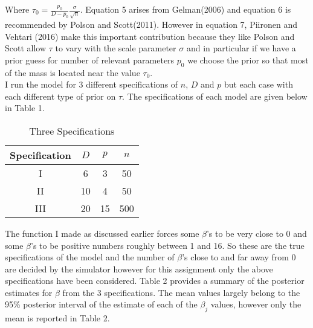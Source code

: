 \documentclass{article}
\begin{document}
Where $\tau_0  = \frac{p_0}{D - p_0}\frac{\sigma}{\sqrt{n}}$. Equation 5 arises from Gelman(2006) and equation 6 is recommended by Polson and Scott(2011). However in equation 7, Piironen and Vehtari (2016) make this important contribution because they like Polson and Scott allow $\tau$ to vary with the scale parameter $\sigma$ and in particular if we have a prior guess for number of relevant parameters $p_0$ we choose the prior so that most of the mass is located near the value $\tau_0$.\\
I run the model for 3 different specifications of $n$, $D$ and $p$ but each case with each different type of prior on $\tau$. The specifications of each model are given below in Table 1.
\begin{table}[H]
\caption {Three Specifications}
\vspace{2mm}
\def\arraystretch{1.5}
\centering \begin{tabular}{c c c c} 
\hline\hline 
\vspace{1mm}
Specification & $D$ &  $p$ & $n$ \\ [0.5ex] 
\hline 
I & 6 & 3 & 50 \\
II &10 & 4 & 50 \\ 
III & 20 & 15 & 500\\
\hline 
\end{tabular}
\end{table}
The function I made as discussed earlier forces some $\beta$'s to be very close to 0 and some $\beta$'s to be positive numbers roughly between 1 and 16. So these are the true specifications of the model and the number of $\beta$'s close to and far away from 0 are decided by the simulator however for this assignment only the above specifications have been considered. Table 2 provides a summary of the posterior estimates for $\beta$ from the 3 specifications. The mean values largely belong to the 95\% posterior interval of the estimate of each of the $\beta_j$ values, however only the mean is reported in Table 2.
\end{document}
